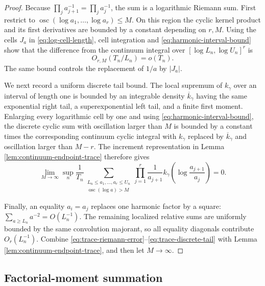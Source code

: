 \documentclass[11pt]{article}
\theoremstyle{remark}
\begin{document}
\begin{proof}
Because $\prod_ja_{j+1}^{-1}=\prod_ja_j^{-1}$, the sum is a logarithmic
Riemann sum.  First restrict to
$\operatorname{osc}(\log a_1,\ldots,\log a_r)\le M$.  On this region the
cyclic kernel product and its first derivatives are bounded by a constant
depending on $r,M$.  Using the cells $J_a$ in
\eqref{eq:log-cell-length}, cell integration and
\eqref{eq:harmonic-interval-bound} show that the difference from the continuum
integral over $[\log L_n,\log U_n]^r$ is
\[
        O_{r,M}(T_n/L_n)=o(T_n).
\tag{10.50}\label{eq:trace-riemann-error}
\]
The same bound controls the replacement of $1/a$ by $|J_a|$.

We next record a uniform discrete tail bound.  The local supremum of
$k_\gamma$ over an interval of length one is bounded by an integrable density
$\overline k_\gamma$ having the same exponential right tail, a
superexponential left tail, and a finite first moment.  Enlarging every
logarithmic cell by one and using
\eqref{eq:harmonic-interval-bound}, the discrete cyclic sum with oscillation
larger than $M$ is bounded by a constant times the corresponding continuum
cyclic integral with $k_\gamma$ replaced by $\overline k_\gamma$ and
oscillation larger than $M-r$.  The increment representation in Lemma
\ref{lem:continuum-endpoint-trace} therefore gives
\[
\lim_{M\to\infty}\sup_n\frac1{T_n}
\sum_{\substack{L_n\le a_1,\ldots,a_r\le U_n\\
 \operatorname{osc}(\log a)>M}}
\prod_{j=1}^r\frac1{a_{j+1}}
 k_\gamma\!\left(\log\frac{a_{j+1}}{a_j}\right)=0.
\tag{10.51}\label{eq:trace-discrete-tail}
\]

Finally, an equality $a_i=a_j$ replaces one harmonic factor by a square:
$\sum_{a\ge L_n}a^{-2}=O(L_n^{-1})$.  The remaining localized relative sums
are uniformly bounded by the same convolution majorant, so all equality
diagonals contribute $O_r(L_n^{-1})$.  Combine
\eqref{eq:trace-riemann-error}--\eqref{eq:trace-discrete-tail} with Lemma
\ref{lem:continuum-endpoint-trace}, and then let $M\to\infty$.
\end{proof}

\subsection{Factorial-moment summation}
\end{document}
